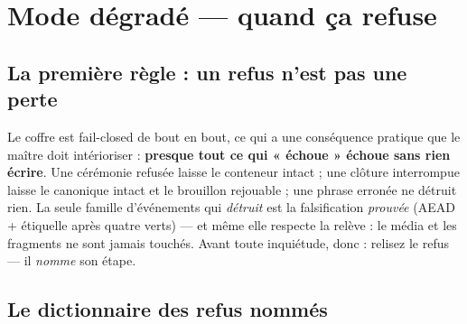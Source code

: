 \section{Mode dégradé — quand ça refuse}\label{sec:degrade}

\subsection{La première règle : un refus n'est pas une perte}

Le coffre est fail-closed de bout en bout, ce qui a une conséquence pratique que le
maître doit intérioriser : \textbf{presque tout ce qui « échoue » échoue sans rien
écrire}. Une cérémonie refusée laisse le conteneur intact ; une clôture interrompue
laisse le canonique intact et le brouillon rejouable ; une phrase erronée ne détruit
rien. La seule famille d'événements qui \emph{détruit} est la falsification
\emph{prouvée} (AEAD + étiquelle après quatre verts) — et même elle respecte la
relève : le média et les fragments ne sont jamais touchés. Avant toute inquiétude,
donc : relisez le refus — il \emph{nomme} son étape.

\subsection{Le dictionnaire des refus nommés}\label{sec:dico}

